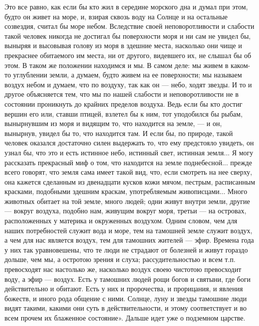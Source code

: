 Это все равно, как если бы кто жил в середине морского дна и думал при
этом,  будто он  живет на  море,  и, взирая  сквозь воду  на Солнце  и
на  остальные  созвездия,  считал  бы  море  небом.  Вследствие  своей
неповоротливости  и  слабости такой  человек  никогда  не достигал  бы
поверхности моря и ни сам не  увидел бы, выныряя и высовывая голову из
моря в  здешние места, насколько  они чище и прекраснее  обитаемого им
места, ни  от другого,  видевшего их,  не слышал бы  об этом.  В таком
же  положении находимся  и  мы.  В самом  деле:  мы  живем в  каком-то
углублении земли, а думаем, будто живем на ее поверхности; мы называем
воздух небом  и думаем,  что по  воздуху, так как  он ---  небо, ходят
звезды.  И то  и  другое объясняется  тем, что  мы  по нашей  слабости
и  неповоротливости  не в  состоянии  проникнуть  до крайних  пределов
воздуха.  Ведь если  бы  кто  достиг вершин  его  или, ставши  птицей,
взлетел  бы к  ним, тот  уподобился бы  рыбам, вынырнувшим  из моря  и
видящим то, что находится на земле,  --- и он, вынырнув, увидел бы то,
что  находится там.  И если  бы,  по природе,  такой человек  оказался
достаточно силен  выдержать то, что  ему предстояло увидеть,  он узнал
бы, что  это и  есть истинное небо,  истинный свет,  истинная земля...
Я  могу  рассказать прекрасный  миф  о  том,  что находится  на  земле
поднебесной... прежде всего  говорят, что земля сама  имеет такой вид,
что, если смотреть на нее  сверху, она кажется сделанным из двенадцати
кусков кожи  мячом, пестрым,  расписанным красками,  подобными здешним
краскам, употребляемым  живописцами... Много  животных обитает  на той
земле,  много  людей;  одни  живут внутри  земли,  другие  ---  вокруг
воздуха, подобно  нам, живущим  вокруг моря,  третьи ---  на островах,
расположенных у материка и окруженных  воздухом. Одним словом, чем для
наших потребностей  служит вода и  море, тем на тамошней  земле служит
воздух, а  чем для нас является  воздух, тем для тамошних  жителей ---
эфир. Времена года у них так  уравновешены, что те люди не страдают от
болезней и  живут гораздо дольше, чем  мы, а остротою зрения  и слуха;
рассудительностью и всем т.п.  превосходят нас настолько же, насколько
воздух  своею чистотою  превосходит воду,  а эфир  --- воздух.  Есть у
тамошних людей рощи богов и святыни, где боги действительно и обитают.
Есть у  них и пророчества,  и прорицания,  и явления божеств,  и иного
рода общение с ними. Солнце, луну и звезды тамошние люди видят такими,
какими они  суть в действительности,  и этому соответствует и  во всем
прочем их блаженное состояние». Дальше идет уже о подземном царстве.

